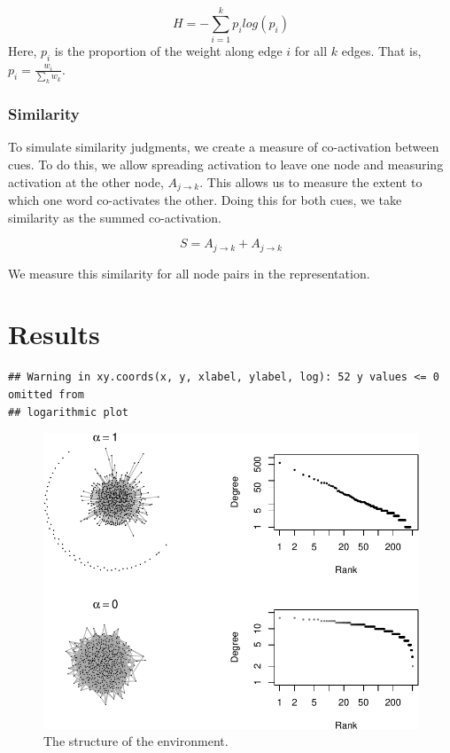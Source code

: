\documentclass[
  man]{apa6}
\begin{document}
\[
H = -\sum_{i=1}^{k}  p_i log(p_i)
\] Here, \(p_i\) is the proportion of the weight along edge \(i\) for all \(k\) edges. That is, \(p_i = \frac{w_i}{\sum_k w_k}\).

\hypertarget{similarity}{%
\subsubsection{Similarity}\label{similarity}}

To simulate similarity judgments, we create a measure of co-activation between cues. To do this, we allow spreading activation to leave one node and measuring activation at the other node, \(A_{j \rightarrow k}\). This allows us to measure the extent to which one word co-activates the other. Doing this for both cues, we take similarity as the summed co-activation.

\[
S = A_{j \rightarrow k} + A_{j \rightarrow k}
\]

We measure this similarity for all node pairs in the representation.

\hypertarget{results}{%
\section{Results}\label{results}}

\begin{verbatim}
## Warning in xy.coords(x, y, xlabel, ylabel, log): 52 y values <= 0 omitted from
## logarithmic plot
\end{verbatim}

\begin{figure}
\centering
\includegraphics{Enrichment_files/figure-latex/fig1-1.pdf}
\caption{\label{fig:fig1}The structure of the environment.}
\end{figure}
\end{document}
